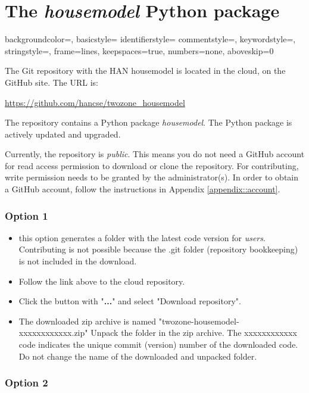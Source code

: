 \section{The \textit{housemodel} Python package}

{
	backgroundcolor=\color{black},
	basicstyle=\footnotesize\color{white}\ttfamily
	identifierstyle=\color{white}
	commentstyle=\color{white},
	keywordstyle=\color{white},
	stringstyle=\color{white},
	frame=lines,
	keepspaces=true,
	numbers=none,
	aboveskip=0\baselineskip
}

The Git repository with the HAN housemodel is located in the cloud, on the GitHub site. The URL is:

\url{https://github.com/hancse/twozone_housemodel}

The repository contains a Python package \emph{housemodel}. The Python package is actively updated and upgraded.

Currently, the repository is \emph{public}. 
This means you do not need a GitHub account for read access permission to download or clone the repository. 
For contributing, write permission needs to be granted by the administrator(s). In order to obtain a GitHub account, follow the instructions in Appendix \ref{appendix::account}.


\subsubsection{Option 1}
\begin{itemize}
	\item this option generates a folder with the latest code version for \emph{users}. Contributing is not possible because the \textsf{.git} folder (repository bookkeeping) is not included in the download. 
	\item Follow the link above to the cloud repository.
	\item Click the button with "\textbf{...}" and select "Download repository".
	\item The downloaded zip archive is named "twozone-housemodel-xxxxxxxxxxxx.zip" Unpack the folder in the zip archive. The xxxxxxxxxxxx code indicates the unique commit (version) number of the downloaded code. Do not change the name of the downloaded and unpacked folder.
\end{itemize}

\subsubsection{Option 2}

